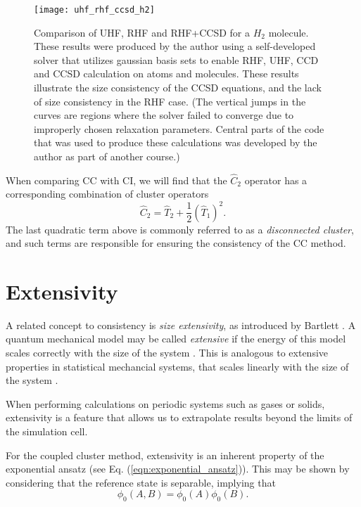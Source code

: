 \begin{figure}[p]
    \centering
    \texttt{[image: uhf\_rhf\_ccsd\_h2]}
    \caption{Comparison of UHF, RHF and RHF+CCSD for a $H_2$
      molecule. These results were produced by the author using a self-developed 
      solver \cite{FermionMingle} that utilizes gaussian
      basis sets to enable RHF, UHF, CCD and CCSD calculation on atoms
      and molecules. These results
      illustrate the size consistency of the CCSD equations, and
      the lack of size consistency in the RHF case. (The vertical
      jumps in the curves are regions where the solver failed to
      converge due to improperly chosen relaxation parameters. Central parts of the code \cite{FermionMingle} that was used to produce these calculations was developed by the author as part of another course.)}
    \label{fig:uhf_rhf_ccsd_h2}
\end{figure}


When comparing CC with CI, we will find that the $\hat{C}_2$ operator
has a corresponding combination of cluster operators
\begin{equation}
\hat{C}_2 = \hat{T}_2 + \frac{1}{2}(\hat{T}_1)^2.
\end{equation} 
The last quadratic term above is commonly referred to as a
\emph{disconnected cluster}, and such terms are responsible for
ensuring the consistency of the CC method.



\section{Extensivity}

A related concept to consistency is \emph{size extensivity}, as
introduced by Bartlett \cite{Bartlett1981}. A quantum mechanical model
may be called \emph{extensive} if the energy of this model scales
correctly with the size of the
system \cite[p.11]{ShavittBartlett2009}. This is analogous to
extensive properties in statistical mechancial systems, that scales
linearly with the size of the system \cite[p.9]{Linder}.

When performing calculations on periodic systems such as gases or
solids, extensivity is a feature that allows us to extrapolate results
beyond the limits of the simulation cell.

For the coupled cluster method, extensivity is an inherent property of
the exponential ansatz (see Eq. (\ref{eqn:exponential_ansatz})). This may be shown
by considering that the reference state is separable, implying that
\begin{equation}
\phi_0(A,B) = \phi_0(A)\phi_0(B).
\end{equation}

